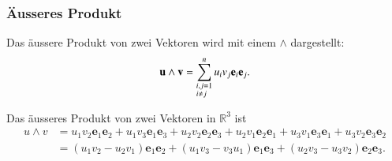 \subsubsection{Äusseres Produkt}
Das äussere Produkt von zwei Vektoren wird mit einem $\wedge$ dargestellt:
\begin{equation}
    \textbf{u}\wedge \textbf{v} 
    = 
    \sum_{\begin{subarray}{l}i,j=1\\i \neq j\end{subarray}}^n  u_iv_j\textbf{e}_i\textbf{e}_j .
\end{equation}
\begin{beispiel}
Das äusseres Produkt von zwei Vektoren in $\mathbb{R}^3$ ist
\begin{equation}
	\begin{split}
		u \wedge v 
		&= 
		u_1v_2\textbf{e}_1\textbf{e}_2 
		+ 
		u_1v_3\textbf{e}_1\textbf{e}_3 
		+ 
		u_2v_2\textbf{e}_2\textbf{e}_3 
		+ 
		u_2v_1\textbf{e}_2\textbf{e}_1 
		+ 
		u_3v_1\textbf{e}_3\textbf{e}_1 
		+
		u_3v_2\textbf{e}_3\textbf{e}_2 \\\ 
		&= 
		(u_1v_2 - u_2v_1)\textbf{e}_1\textbf{e}_2 
		+ 
		(u_1v_3 - v_3u_1)\textbf{e}_1\textbf{e}_3 
		+ 
		(u_2v_3 - u_3v_2)\textbf{e}_2\textbf{e}_3.
	\end{split}
\end{equation}
\end{beispiel}

